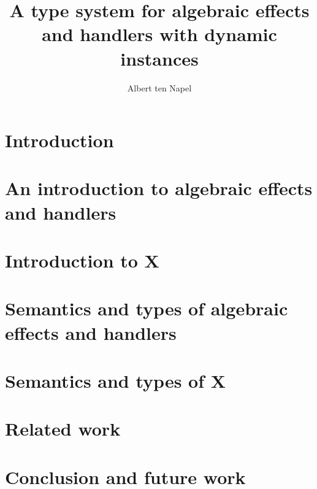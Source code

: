\documentclass[12pt]{book}
\title{A type system for algebraic effects and handlers with dynamic instances}
\author{Albert ten Napel}
\date{}
\begin{document}
\maketitle

\tableofcontents
\newpage

\chapter{Introduction}


\chapter{An introduction to algebraic effects and handlers}


\chapter{Introduction to X}


\chapter{Semantics and types of algebraic effects and handlers}


\chapter{Semantics and types of X}


\chapter{Related work}

\chapter{Conclusion and future work}

\end{document}
